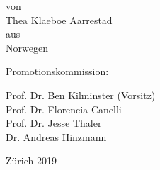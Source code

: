 \begin{center}

\vspace{0.2in}
von \\
\vspace{0.05in}
{\large Thea Klaeboe Aarrestad} \\
aus \\
Norwegen \\
\par
\vspace{0.2in}


Promotionskommission:\\
\par
\vspace{0.1in}


Prof. Dr. Ben Kilminster (Vorsitz)\\
Prof. Dr. Florencia Canelli\\
Prof. Dr. Jesse Thaler\\
Dr. Andreas Hinzmann\\

\par
\vspace{0.2in}


Z\"urich 2019

\end{center}
